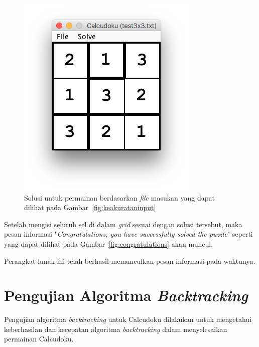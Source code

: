 \begin{enumerate}
\begin{figure}
\centering
\captionsetup{justification=centering}
\includegraphics[scale=0.5]{Gambar/ImplementasiPengujian/Output2.png}
\caption[Solusi untuk permainan berdasarkan \textit{file} masukan yang dapat dilihat pada Gambar~\ref{fig:keakurataninput}]{Solusi untuk permainan berdasarkan \textit{file} masukan yang dapat dilihat pada Gambar~\ref{fig:keakurataninput}}
\label{fig:keakuratansolusi}
\end{figure}

Setelah mengisi seluruh sel di dalam \textit{grid} sesuai dengan solusi tersebut, maka pesan informasi "\textit{Congratulations, you have successfully solved the puzzle}" seperti yang dapat dilihat pada Gambar~\ref{fig:congratulations} akan muncul.

Perangkat lunak ini telah berhasil memunculkan pesan informasi pada waktunya.

\end{enumerate}

\section{Pengujian Algoritma \textit{Backtracking}}
\label{sec:pengujianbacktracking}

Pengujian algoritma \textit{backtracking} untuk Calcudoku dilakukan untuk mengetahui keberhasilan dan kecepatan algoritma \textit{backtracking} dalam menyelesaikan permainan Calcudoku.

